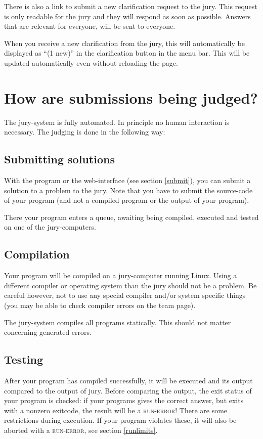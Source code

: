 There is also a link to submit a new clarification request to the
jury. This request is only readable for the jury and they will respond
as soon as possible. Answers that are relevant for everyone, will be
sent to everyone.

When you receive a new clarification from the jury, this will
automatically be displayed as ``(1 new)'' in the clarification button
in the menu bar. This will be updated automatically even without reloading
the page.

\section{How are submissions being judged?}

The \DOMjudge jury-system is fully automated. In principle no human
interaction is necessary. The judging is done in the following way:

\subsection{Submitting solutions}

With the  program or the web-interface (see section
\ref{submit}), you can submit a solution to a problem to the jury.
Note that you have to submit the source-code of your program
(and not a compiled program or the output of your program).

There your program enters a queue, awaiting being compiled, executed
and tested on one of the jury-computers.

\subsection{Compilation}

Your program will be compiled on a jury-computer running Linux.
Using a different compiler or operating system than the jury should
not be a problem. Be careful however, not to use any special compiler
and/or system specific things (you may be able to check compiler errors
on the team page).

The jury-system compiles all programs statically. This should not
matter concerning generated errors.

\subsection{Testing}

After your program has compiled successfully, it will be executed and
its output compared to the output of jury. Before comparing the
output, the exit status of your program is checked: if your programs
gives the correct answer, but exits with a nonzero exitcode, the
result will be a \textsc{run-error}! There are some restrictions during
execution. If your program violates these, it will also be aborted
with a \textsc{run-error}, see section \ref{runlimits}.

